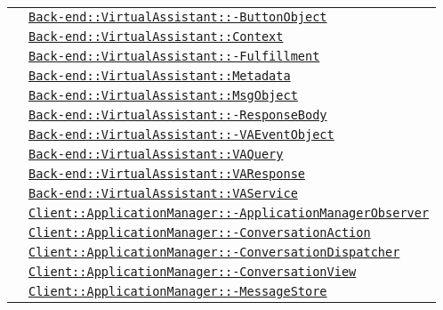 \begin{longtable}{|>{\centering}m{3cm}|m{10cm}<{\centering}|}
& \hyperref[Back-end::VirtualAssistant::ButtonObject]{\texttt{Back-end::VirtualAssistant::-\linebreak ButtonObject}}\\
& \hyperref[Back-end::VirtualAssistant::Context]{\texttt{Back-end::VirtualAssistant::Context}}\\
& \hyperref[Back-end::VirtualAssistant::Fulfillment]{\texttt{Back-end::VirtualAssistant::-\linebreak Fulfillment}}\\
& \hyperref[Back-end::VirtualAssistant::Metadata]{\texttt{Back-end::VirtualAssistant::Metadata}}\\
& \hyperref[Back-end::VirtualAssistant::MsgObject]{\texttt{Back-end::VirtualAssistant::MsgObject}}\\
& \hyperref[Back-end::VirtualAssistant::ResponseBody]{\texttt{Back-end::VirtualAssistant::-\linebreak ResponseBody}}\\
& \hyperref[Back-end::VirtualAssistant::VAEventObject]{\texttt{Back-end::VirtualAssistant::-\linebreak VAEventObject}}\\
& \hyperref[Back-end::VirtualAssistant::VAQuery]{\texttt{Back-end::VirtualAssistant::VAQuery}}\\
& \hyperref[Back-end::VirtualAssistant::VAResponse]{\texttt{Back-end::VirtualAssistant::VAResponse}}\\
& \hyperref[Back-end::VirtualAssistant::VAService]{\texttt{Back-end::VirtualAssistant::VAService}}\\
& \hyperref[Client::ApplicationManager::ApplicationManagerObserver]{\texttt{Client::ApplicationManager::-\linebreak ApplicationManagerObserver}}\\
& \hyperref[Client::ApplicationManager::ConversationAction]{\texttt{Client::ApplicationManager::-\linebreak ConversationAction}}\\
& \hyperref[Client::ApplicationManager::ConversationDispatcher]{\texttt{Client::ApplicationManager::-\linebreak ConversationDispatcher}}\\
& \hyperref[Client::ApplicationManager::ConversationView]{\texttt{Client::ApplicationManager::-\linebreak ConversationView}}\\
& \hyperref[Client::ApplicationManager::MessageStore]{\texttt{Client::ApplicationManager::-\linebreak MessageStore}}\\

\end{longtable}
